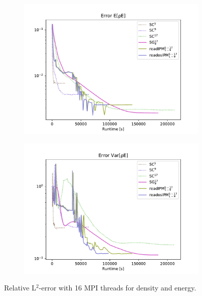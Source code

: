 \begin{figure}[h!]
	\begin{subfigure}{0.5\linewidth}
		\centering
				\includegraphics[scale=0.5]{figs/Euler2D/L2_error_E[rhoE].pdf}
		\label{fig:sub1}
	\end{subfigure}%
	\begin{subfigure}{0.5\linewidth}
		\centering
				\includegraphics[scale=0.5]{figs/Euler2D/L2_error_Var[rhoE].pdf}
		\label{fig:sub2}
	\end{subfigure}
	\caption{Relative L$^2$-error with 16 MPI threads for density and energy.}
	\label{fig:L2ErrorSolution2D}
\end{figure}
